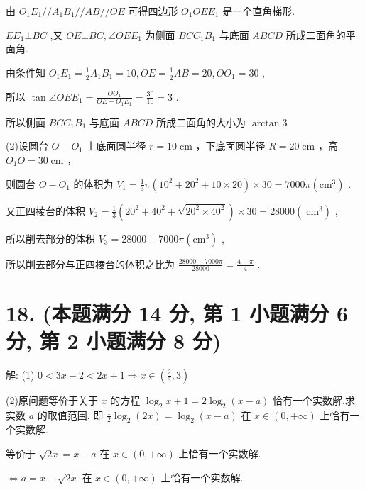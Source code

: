\documentclass[10pt]{article}
\begin{document}
由 \({O}_{1}{E}_{1}//{A}_{1}{B}_{1}//{AB}//{OE}\) 可得四边形 \({O}_{1}{OE}{E}_{1}\) 是一个直角梯形.

\(E{E}_{1} \bot  {BC}\) ,又 \({OE} \bot  {BC},\angle {OE}{E}_{1}\) 为侧面 \({BC}{C}_{1}{B}_{1}\) 与底面 \({ABCD}\) 所成二面角的平面角.

由条件知 \({O}_{1}{E}_{1} = \frac{1}{2}{A}_{1}{B}_{1} = {10},{OE} = \frac{1}{2}{AB} = {20},O{O}_{1} = {30}\) ,

所以 \(\tan \angle {OE}{E}_{1} = \frac{O{O}_{1}}{{OE} - {O}_{1}{E}_{1}} = \frac{30}{10} = 3\) .

所以侧面 \({BC}{C}_{1}{B}_{1}\) 与底面 \({ABCD}\) 所成二面角的大小为 \(\arctan 3\)

(2)设圆台 \(O - {O}_{1}\) 上底面圆半径 \(r = {10}\mathrm{\;{cm}}\) ，下底面圆半径 \(R = {20}\mathrm{\;{cm}}\) ，高 \({O}_{1}O = {30}\mathrm{\;{cm}}\) ，

则圆台 \(O - {O}_{1}\) 的体积为 \({V}_{1} = \frac{1}{3}\pi \left( {{10}^{2} + {20}^{2} + {10} \times  {20}}\right)  \times  {30} = {7000\pi }\left( {\mathrm{{cm}}}^{3}\right)\) .

又正四棱台的体积 \({V}_{2} = \frac{1}{3}\left( {{20}^{2} + {40}^{2} + \sqrt{{20}^{2} \times  {40}^{2}}}\right)  \times  {30} = {28000}\left( {\mathrm{\;{cm}}}^{3}\right)\) ,

所以削去部分的体积 \({V}_{3} = {28000} - {7000\pi }\left( {\mathrm{{cm}}}^{3}\right)\) ,

所以削去部分与正四棱台的体积之比为 \(\frac{{28000} - {7000\pi }}{28000} = \frac{4 - \pi }{4}\) .

\section*{18. (本题满分 14 分, 第 1 小题满分 6 分, 第 2 小题满分 8 分)}

解: (1) \(0 < {3x} - 2 < {2x} + 1 \Rightarrow  x \in  \left( {\frac{2}{3},3}\right)\)

(2)原问题等价于关于 \(x\) 的方程 \({\log }_{2}x + 1 = 2{\log }_{2}\left( {x - a}\right)\) 恰有一个实数解,求实数 \(a\) 的取值范围. 即 \(\frac{1}{2}{\log }_{2}\left( {2x}\right)  = {\log }_{2}\left( {x - a}\right)\) 在 \(x \in  \left( {0, + \infty }\right)\) 上恰有一个实数解.

等价于 \(\sqrt{2x} = x - a\) 在 \(x \in  \left( {0, + \infty }\right)\) 上恰有一个实数解.

\(\Leftrightarrow  a = x - \sqrt{2x}\) 在 \(x \in  \left( {0, + \infty }\right)\) 上恰有一个实数解.
\end{document}
